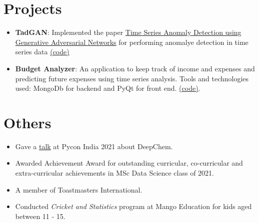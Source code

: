\documentclass[letterpaper,11pt]{article}
\newcommand{\resumeItem}[2]{
  \item\small{
    \textbf{#1}{: #2 \vspace{-2pt}}
  }
}
\newcommand{\resumeItemSimple}[1]{
  \item\small{
    {#1 \vspace{-2pt}}
  }
}
\newcommand{\resumeSubItem}[2]{\resumeItem{#1}{#2}\vspace{-4pt}}
\newcommand{\resumeSubItemSimple}[1]{\resumeItemSimple{#1}\vspace{-4pt}}
\newcommand{\resumeSubHeadingListStart}{\begin{itemize}[leftmargin=*]}
\newcommand{\resumeSubHeadingListEnd}{\end{itemize}}
\begin{document}
\section{Projects}
  \resumeSubHeadingListStart
    \resumeSubItem{TadGAN}
      {Implemented the paper \href{https://arxiv.org/abs/2009.07769}{Time Series Anomaly Detection using Generative Adversarial Networks} for performing anomalye detection in time series data \href{https://github.com/arunppsg/tadGAN}{(code)}}
    \resumeSubItem{Budget Analyzer}
      {An application to keep track of income and expenses and predicting future expenses using time series analysis. Tools and technologies used: MongoDb for backend and PyQt for front end. \href{https://github.com/arunppsg/budget-analyzer}{(code)}.}
  \resumeSubHeadingListEnd

\section{Others}
  \resumeSubHeadingListStart
    \resumeSubItemSimple {Gave a \href{https://www.youtube.com/watch?v=JEFrzjpf6d0}{talk} at Pycon India 2021 about DeepChem.}
    \resumeSubItemSimple {Awarded Achievement Award for outstanding curricular, co-curricular and extra-curricular achievements in MSc Data Science class of 2021.}
    \resumeSubItemSimple {A member of Toastmasters International.}
    \resumeSubItemSimple {Conducted \textit{Cricket and Statistics} program at Mango Education for kids aged between 11 - 15.}
  \resumeSubHeadingListEnd
%
%
\end{document}
